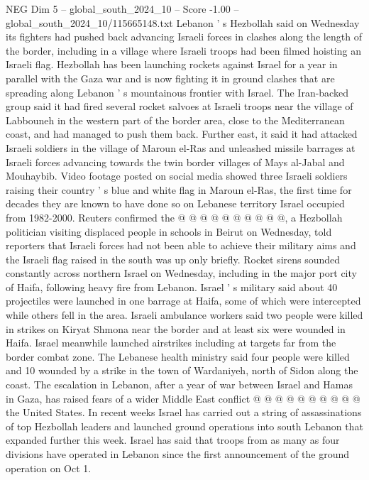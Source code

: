 \begin{textsample}{NEG Dim 5 – global\_south\_2024\_10 – Score -1.00 – global\_south\_2024\_10/115665148.txt}  \label{ex:f5_neg_130}
Lebanon ' s Hezbollah said on Wednesday its fighters had pushed back advancing Israeli forces in clashes along the length of the border, including in a village where Israeli troops had been filmed hoisting an Israeli flag.
Hezbollah has been launching rockets against Israel for a year in parallel with the Gaza war and is now fighting it in ground clashes that are spreading along Lebanon ' s mountainous frontier with Israel.
The Iran-backed group said it had fired several rocket salvoes at Israeli troops near the village of Labbouneh in the western part of the border area, close to the Mediterranean coast, and had managed to push them back.
Further east, it said it had attacked Israeli soldiers in the village of Maroun el-Ras and unleashed missile barrages at Israeli forces advancing towards the twin border villages of Mays al-Jabal and Mouhaybib.
Video footage posted on social media showed three Israeli soldiers raising their country ' s blue and white flag in Maroun el-Ras, the first time for decades they are known to have done so on Lebanese territory Israel occupied from 1982-2000.
Reuters confirmed the @ @ @ @ @ @ @ @ @ @, a Hezbollah politician visiting displaced people in schools in Beirut on Wednesday, told reporters that Israeli forces had not been able to achieve their military aims and the Israeli flag raised in the south was up only briefly.
Rocket sirens sounded constantly across northern Israel on Wednesday, including in the major port city of Haifa, following heavy fire from Lebanon.
Israel ' s military said about 40 projectiles were launched in one barrage at Haifa, some of which were intercepted while others fell in the area.
Israeli ambulance workers said two people were killed in strikes on Kiryat Shmona near the border and at least six were wounded in Haifa.
Israel meanwhile launched airstrikes including at targets far from the border combat zone.
The Lebanese health ministry said four people were killed and 10 wounded by a strike in the town of Wardaniyeh, north of Sidon along the coast.
The escalation in Lebanon, after a year of war between Israel and Hamas in Gaza, has raised fears of a wider Middle East conflict @ @ @ @ @ @ @ @ @ @ the United States.
In recent weeks Israel has carried out a string of assassinations of top Hezbollah leaders and launched ground operations into south Lebanon that expanded further this week.
Israel has said that troops from as many as four divisions have operated in Lebanon since the first announcement of the ground operation on Oct 1.

\end{textsample}
